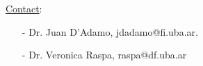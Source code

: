\documentclass[english,12pt,a4paper]{article}
\begin{document}
	\noindent\underline{Contact}:
	\begin{itemize}\itemsep -5pt
		\item[-] Dr. Juan D'Adamo, jdadamo@fi.uba.ar. 
		\item[-] Dr. Veronica Raspa, raspa@df.uba.ar
	\end{itemize}
	
	
	
	
	
\end{document}

